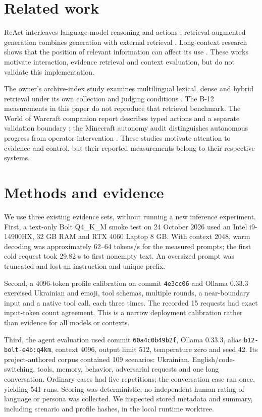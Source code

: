 \documentclass[11pt]{article}
\begin{document}
\section{Related work}
ReAct interleaves language-model reasoning and actions \cite{react}; retrieval-augmented generation combines generation with external retrieval \cite{rag}. Long-context research shows that the position of relevant information can affect its use \cite{lost}. These works motivate interaction, evidence retrieval and context evaluation, but do not validate this implementation.

The owner's archive-index study examines multilingual lexical, dense and hybrid retrieval under its own collection and judging conditions \cite{archive}. The B-12 measurements in this paper do not reproduce that retrieval benchmark. The World of Warcraft companion report describes typed actions and a separate validation boundary \cite{wow}; the Minecraft autonomy audit distinguishes autonomous progress from operator intervention \cite{minecraft}. These studies motivate attention to evidence and control, but their reported measurements belong to their respective systems.
\section{Methods and evidence}
We use three existing evidence sets, without running a new inference experiment. First, a text-only Bolt Q4\_K\_M smoke test on 24 October 2026 used an Intel i9-14900HX, 32 GB RAM and RTX 4060 Laptop 8 GB. With context 2048, warm decoding was approximately 62--64 tokens/s for the measured prompts; the first cold request took 29.82 s to first nonempty text. An oversized prompt was truncated and lost an instruction and unique prefix.

Second, a 4096-token profile calibration on commit \texttt{4e3cc06} and Ollama 0.33.3 exercised Ukrainian and emoji, tool schemas, multiple rounds, a near-boundary input and a native tool call, each three times. The recorded 15 requests had exact input-token count agreement. This is a narrow deployment calibration rather than evidence for all models or contexts.

Third, the agent evaluation used commit \texttt{60a4c0b49b2f}, Ollama 0.33.3, alias \texttt{b12-bolt-e4b:q4km}, context 4096, output limit 512, temperature zero and seed 42. Its project-authored corpus contained 109 scenarios: Ukrainian, English/code-switching, tools, memory, behavior, adversarial requests and one long conversation. Ordinary cases had five repetitions; the conversation case ran once, yielding 541 runs. Scoring was deterministic; no independent human rating of language or persona was collected. We inspected stored metadata and summary, including scenario and profile hashes, in the local runtime worktree.
\end{document}
